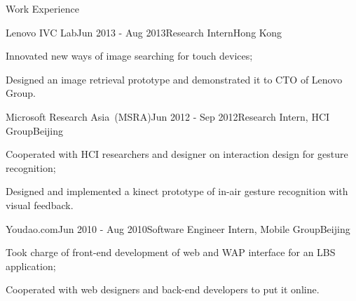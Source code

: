 \documentclass{cv_professional-en} %
\begin{document}

\begin{rSection}{Work Experience}
    
\begin{rSubsection}{Lenovo IVC Lab}{Jun 2013 - Aug 2013}{Research Intern}{Hong Kong}
    \item Innovated new ways of image searching for touch devices;
    \item Designed an image retrieval prototype and demonstrated it to CTO of Lenovo Group.
\end{rSubsection}

\begin{rSubsection}{Microsoft Research Asia~(MSRA)}{Jun 2012 - Sep 2012}{Research Intern, HCI Group}{Beijing}
    \item Cooperated with HCI researchers and designer on interaction design for gesture recognition;
    \item Designed and implemented a kinect prototype of in-air gesture recognition with visual feedback.
\end{rSubsection}

\begin{rSubsection}{Youdao.com}{Jun 2010 - Aug 2010}{Software Engineer Intern, Mobile Group}{Beijing}
    \item Took charge of front-end development of web and WAP interface for an LBS application;
    \item Cooperated with web designers and back-end developers to put it online.
\end{rSubsection}

\end{rSection}


\end{document}
